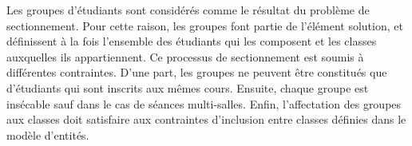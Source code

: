 Les groupes d'étudiants sont considérés comme le résultat du problème de sectionnement.
Pour cette raison, les groupes font partie de l'élément solution, et définissent à la fois l'ensemble des étudiants qui les composent et les classes auxquelles ils appartiennent.
Ce processus de sectionnement est soumis à différentes contraintes.
D'une part, les groupes ne peuvent être constitués que d'étudiants qui sont inscrits aux mêmes cours.
Ensuite, chaque groupe est insécable sauf dans le cas de séances multi-salles.
Enfin, l'affectation des groupes aux classes doit satisfaire aux contraintes d'inclusion entre classes définies dans le modèle d'entités.








